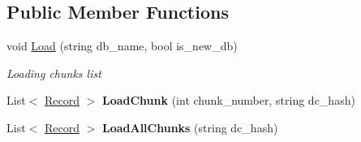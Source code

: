 \subsection*{Public Member Functions}
\begin{DoxyCompactItemize}
\item 
void \hyperlink{class_dwarf_d_b_1_1_chunk_manager_1_1_chunk_manager_a607e45973d9d32b61e0f18edb09f1229}{Load} (string db\+\_\+name, bool is\+\_\+new\+\_\+db)
\begin{DoxyCompactList}\small\item\em Loading chunks list \end{DoxyCompactList}\item 
\hypertarget{class_dwarf_d_b_1_1_chunk_manager_1_1_chunk_manager_a8be3a24a6c82e512d0eb547affa86701}{List$<$ \hyperlink{class_dwarf_d_b_1_1_data_structures_1_1_record}{Record} $>$ {\bfseries Load\+Chunk} (int chunk\+\_\+number, string dc\+\_\+hash)}\label{class_dwarf_d_b_1_1_chunk_manager_1_1_chunk_manager_a8be3a24a6c82e512d0eb547affa86701}

\item 
\hypertarget{class_dwarf_d_b_1_1_chunk_manager_1_1_chunk_manager_a8b2837bcd58aba42d46cf9327a6563fb}{List$<$ \hyperlink{class_dwarf_d_b_1_1_data_structures_1_1_record}{Record} $>$ {\bfseries Load\+All\+Chunks} (string dc\+\_\+hash)}\label{class_dwarf_d_b_1_1_chunk_manager_1_1_chunk_manager_a8b2837bcd58aba42d46cf9327a6563fb}


\end{DoxyCompactItemize}
